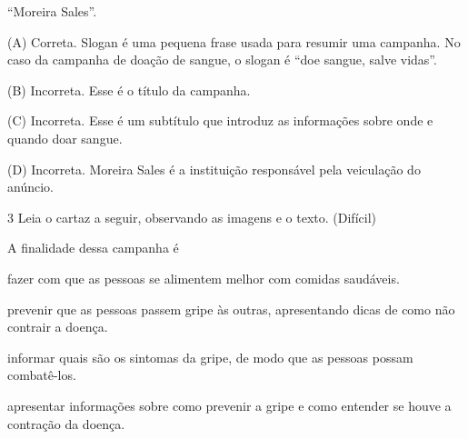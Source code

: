 \begin{escolha}
\begin{escolha}
\begin{escolha}
\item ``Moreira Sales''.
\end{escolha}


(A) Correta. Slogan é uma pequena frase usada para resumir uma campanha.
No caso da campanha de doação de sangue, o slogan é ``doe sangue, salve
vidas''.

(B) Incorreta. Esse é o título da campanha.

(C) Incorreta. Esse é um subtítulo que introduz as informações sobre
onde e quando doar sangue.

(D) Incorreta. Moreira Sales é a instituição responsável pela veiculação
do anúncio.

\num{3} Leia o cartaz a seguir, observando as imagens e o texto. (Difícil)


A finalidade dessa campanha é

\begin{escolha}
\item fazer com que as pessoas se alimentem melhor com comidas saudáveis.

\item prevenir que as pessoas passem gripe às outras, apresentando dicas
de como não contrair a doença.

\item informar quais são os sintomas da gripe, de modo que as pessoas
possam combatê-los.

\item apresentar informações sobre como prevenir a gripe e como entender
se houve a contração da doença.
\end{escolha}

\end{escolha}
\end{escolha}
